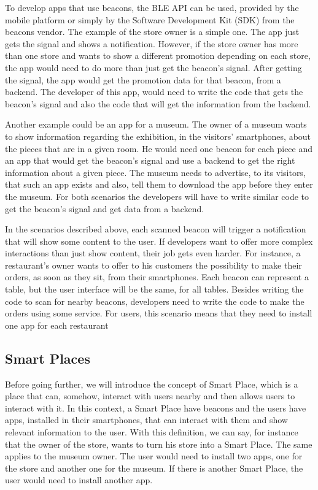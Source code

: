 To develop apps that use beacons, the 
BLE API can be used, provided by the 
mobile platform or simply by the Software
Development Kit (SDK) from the 
beacons vendor. The example of the store owner is a
simple one. The app just gets the signal and shows a 
notification. However, if the store owner has more than
one store and wants to show a different promotion depending
on each store, the app would need to do more than just get
the beacon's signal. After getting the signal, the app
would get the promotion data for that beacon, from a 
backend. The developer of this app, would need to
write the code that gets the beacon's signal and also
the code that will get the information from the backend.

Another example could be an app for a museum. The owner
of a museum wants to show information regarding the
exhibition, in the 
visitors' smartphones, about the pieces that are in a given
room. He would need one beacon for each piece and an app
that would get the beacon's signal and use a
backend to get the right information about a given piece.
The museum needs to advertise, to its visitors, that such
an app exists and also, tell them to download the app
before they enter the museum. For both scenarios the developers will have to write similar code to get
the beacon's signal and get data from a backend.

In the scenarios described above, each scanned beacon
will trigger a notification that will show
some content to the user. If developers want to
offer more complex interactions than just show
content, their job gets even harder.
For instance, a restaurant's owner wants to
offer to his customers the possibility to make
their orders, as soon as they sit, from their
smartphones. Each beacon can represent a table,
but the user interface will be the same, for all
tables. Besides writing the code to scan for nearby
beacons, developers need to write the code to make
the orders using some service. 
For users, this scenario means that they need
to install one app for each restaurant

\subsection{Smart Places}
\label{sub:smart_places}
Before going further, we will introduce the concept of
Smart Place, which is a place that can, somehow,
interact with users nearby and then allows 
users to interact 
with it.
In this context, a Smart Place have beacons and the users
have apps, installed in their smartphones, 
that can interact
with them and show relevant information to the user.
With this definition, we can say, for instance
that the owner of the store, wants to
turn his store into a Smart Place.
The same applies to the museum owner.
The user would need to install two apps, one for the
store and another one for the museum.
If there is another Smart Place, the user would need to
install another app.

